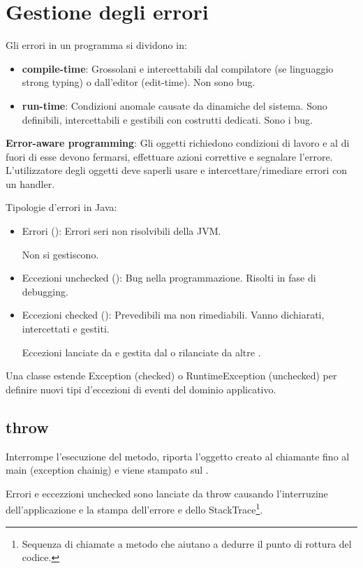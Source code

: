 \section{Gestione degli errori}
Gli errori in un programma si dividono in:
\begin{itemize}
	\item \textbf{compile-time}: Grossolani e intercettabili dal compilatore (se linguaggio strong typing) o dall'editor (edit-time). Non sono bug.
	\item \textbf{run-time}: Condizioni anomale causate da dinamiche del sistema. Sono definibili, intercettabili e gestibili con costrutti dedicati. Sono i bug.
\end{itemize}

\textbf{Error-aware programming}: Gli oggetti richiedono condizioni di lavoro e al di fuori di esse devono fermarsi, effettuare azioni correttive e segnalare l'errore. L'utilizzatore degli oggetti deve saperli usare e intercettare/rimediare errori con un handler.

Tipologie d'errori in Java:
\begin{itemize}
	\item Errori (): Errori seri non risolvibili della JVM.

	Non si gestiscono.
	\item Eccezioni unchecked (): Bug nella programmazione. Risolti in fase di debugging.
	\item Eccezioni checked (): Prevedibili ma non rimediabili. Vanno dichiarati, intercettati e gestiti.

	Eccezioni lanciate da  e gestita dal  o rilanciate da altre .
\end{itemize}

Una classe estende Exception (checked) o RuntimeException (unchecked) per definire nuovi tipi d'eccezioni di eventi del dominio applicativo.

\subsection{throw}
Interrompe l'esecuzione del metodo, riporta l'oggetto creato al chiamante fino al main (exception chainig) e viene stampato sul .


Errori e eccezzioni unchecked sono lanciate da throw causando l'interruzine dell'applicazione e la stampa dell'errore e dello StackTrace\footnote{Sequenza di chiamate a metodo che aiutano a dedurre il punto di rottura del codice.}.


